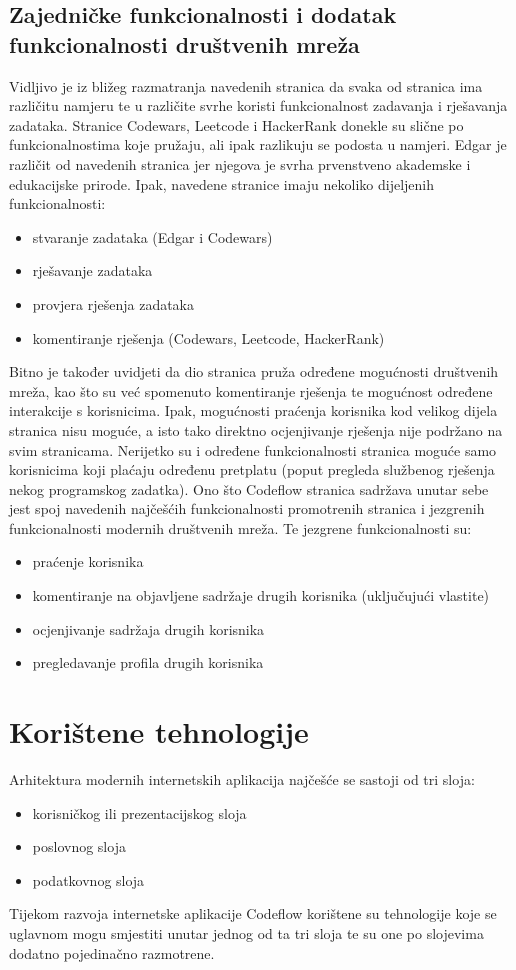 \documentclass[times, utf8, zavrsni]{fer}
\begin{document}
		\section{Zajedničke funkcionalnosti i dodatak funkcionalnosti društvenih mreža}
		Vidljivo je iz bližeg razmatranja navedenih stranica da svaka od stranica ima različitu namjeru te u različite svrhe koristi funkcionalnost zadavanja i rješavanja zadataka. Stranice Codewars, Leetcode i HackerRank donekle su slične po funkcionalnostima koje pružaju, ali ipak razlikuju se podosta u namjeri. Edgar je različit od navedenih stranica jer njegova je svrha prvenstveno akademske i edukacijske prirode. Ipak, navedene stranice imaju nekoliko dijeljenih funkcionalnosti:
		\begin{itemize}
			\item stvaranje zadataka (Edgar i Codewars)
			\item rješavanje zadataka
			\item provjera rješenja zadataka
			\item komentiranje rješenja (Codewars, Leetcode, HackerRank)
		\end{itemize}
		Bitno je također uvidjeti da dio stranica pruža određene mogućnosti društvenih mreža, kao što su već spomenuto komentiranje rješenja te mogućnost određene interakcije s korisnicima. Ipak, mogućnosti praćenja korisnika kod velikog dijela stranica nisu moguće, a isto tako direktno ocjenjivanje rješenja nije podržano na svim stranicama. Nerijetko su i određene funkcionalnosti stranica moguće samo korisnicima koji plaćaju određenu pretplatu (poput pregleda službenog rješenja nekog programskog zadatka).
		Ono što Codeflow stranica sadržava unutar sebe jest spoj navedenih najčešćih funkcionalnosti promotrenih stranica i jezgrenih funkcionalnosti modernih društvenih mreža. Te jezgrene funkcionalnosti su:
		\begin{itemize}
			\item praćenje korisnika
			\item komentiranje na objavljene sadržaje drugih korisnika (uključujući vlastite)
			\item ocjenjivanje sadržaja drugih korisnika
			\item pregledavanje profila drugih korisnika
		\end{itemize}
	
	
	\chapter{Korištene tehnologije}
	\label{cha:tehnologije}
	Arhitektura modernih internetskih aplikacija najčešće se sastoji od tri sloja:
	\begin{itemize}
		\item korisničkog ili prezentacijskog sloja
		\item poslovnog sloja
		\item podatkovnog sloja
	\end{itemize}
	Tijekom razvoja internetske aplikacije Codeflow korištene su tehnologije koje se uglavnom mogu smjestiti unutar jednog od ta tri sloja te su one po slojevima dodatno pojedinačno razmotrene.
	
\end{document}
